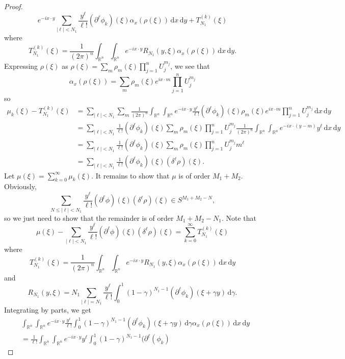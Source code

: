 \documentclass[10pt]{article}
\theoremstyle{remark}
\theoremstyle{definition}
\begin{document}
\begin{proof}
$$e^{-ix\cdot y}\sum_{|\ell|<N_1}\frac{y^{\ell}}{\ell!}
(\partial^{\ell}\phi_k)(\xi)\alpha_x(\rho(\xi))
\,\mathrm dx\,\mathrm dy+T_{N_1}^{(k)}(\xi)$$
where
$$T_{N_1}^{(k)}(\xi)=\frac{1}{(2\pi)^n}\int_{\mathbb R^n}\!\int_{\mathbb R^n}\!
e^{-ix\cdot y}R_{N_1}(y,\xi)\alpha_x(\rho(\xi))\,\mathrm dx\,\mathrm dy.$$
Expressing $\rho(\xi)$ as $\rho(\xi)=\sum_m\rho_m(\xi)\prod_{j=1}^nU_j^{m_j}$, we see
that $$\alpha_x(\rho(\xi))=\sum_m\rho_m(\xi)e^{ix\cdot m}\prod_{j=1}^nU_j^{m_j}$$ so
\begin{align*}
\mu_k(\xi)-T_{N_1}^{(k)}(\xi)
&=\sum_{|\ell|<N_1}\sum_m\frac{1}{(2\pi)^n}
\int_{\mathbb R^n}\!\int_{\mathbb R^n}\!
e^{-ix\cdot y}\frac{y^{\ell}}{\ell!}
(\partial^{\ell}\phi_k)(\xi)
\rho_m(\xi)e^{ix\cdot m}\prod_{j=1}^nU_j^{m_j}\,\mathrm dx\,\mathrm dy \\
&=\sum_{|\ell|<N_1}\frac{1}{\ell!}
(\partial^{\ell}\phi_k)(\xi)
\sum_m\rho_m(\xi)\prod_{j=1}^nU_j^{m_j}\frac{1}{(2\pi)^n}
\int_{\mathbb R^n}\!\int_{\mathbb R^n}\!e^{-ix\cdot(y-m)}y^{\ell}
\,\mathrm dx\,\mathrm dy \\
&=\sum_{|\ell|<N_1}\frac{1}{\ell!}(\partial^{\ell}\phi_k)(\xi)
\sum_m\rho_m(\xi)\prod_{j=1}^nU_j^{m_j}m^{\ell} \\
&=\sum_{|\ell|<N_1}\frac{1}{\ell!}
(\partial^{\ell}\phi_k)(\xi)(\delta^{\ell}\rho)(\xi).
\end{align*}
Let $\mu(\xi)=\sum_{k=0}^{\infty}\mu_k(\xi)$. It remains to show that
$\mu$ is of order $M_1+M_2$. Obviously,
$$\sum_{N\le|\ell|<N_1}\frac{y^{\ell}}{\ell!}
(\partial^{\ell}\phi)(\xi)(\delta^{\ell}\rho)(\xi)\in S^{M_1+M_2-N},$$
so we just need to show that the remainder is of order $M_1+M_2-N_1$.
Note that
$$\mu(\xi)-\sum_{|\ell|<N_1}\frac{y^{\ell}}{\ell!}
(\partial^{\ell}\phi)(\xi)(\delta^{\ell}\rho)(\xi)
=\sum_{k=0}^{\infty}T_{N_1}^{(k)}(\xi)$$
where
$$T_{N_1}^{(k)}(\xi)=\frac{1}{(2\pi)^n}\int_{\mathbb R^n}\!\int_{\mathbb R^n}\!
e^{-ix\cdot y}R_{N_1}(y,\xi)\alpha_x(\rho(\xi))\,\mathrm dx\,\mathrm dy$$
and
$$R_{N_1}(y,\xi)
=N_1\sum_{|\ell|=N_1}\frac{y^{\ell}}{\ell!}
\int_0^1\!(1-\gamma)^{N_1-1}(\partial^{\ell}\phi_k)(\xi+\gamma y)
\,\mathrm d\gamma.$$
Integrating by parts, we get
\begin{align*}
&\int_{\mathbb R^n}\!\int_{\mathbb R^n}\!
e^{-ix\cdot y}\frac{y^{\ell}}{\ell!}\int_0^1(1-\gamma)^{N_1-1}
(\partial^{\ell}\phi_k)(\xi+\gamma y)\,\mathrm d\gamma\alpha_x(\rho(\xi))
\,\mathrm dx\,\mathrm dy \\
&= \frac{1}{\ell!}\int_{\mathbb R^n}\!\int_{\mathbb R^n}\!
e^{-ix\cdot y}y^{\ell}\int_0^1(1-\gamma)^{N_1-1}(\partial^{\ell}(\phi_k)

\end{align*}
\end{proof}
\end{document}
